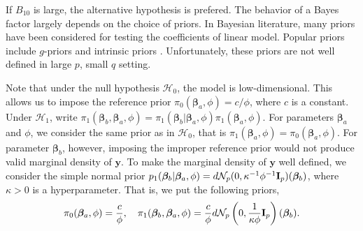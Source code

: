 \documentclass[11pt]{article}
\newcommand{\By}{\mathbf{y}}    \newcommand{\Bz}{\mathbf{z}}
\newcommand{\bfsym}[1]{\ensuremath{\boldsymbol{#1}}}
\def\bbeta{\bfsym \beta}
\theoremstyle{plain}
\theoremstyle{definition}
\theoremstyle{remark}
\begin{document}
If $B_{10}$ is large, the alternative hypothesis is prefered.
The behavior of a Bayes factor largely depends on the choice of priors.
In Bayesian literature, many priors have been considered for testing the coefficients of linear model.
Popular priors include $g$-priors \citep{Liang2008Mixtures} and intrinsic priors \citep{Casella2006Obj}.
Unfortunately, these priors are not well defined in large $p$, small $q$ setting.

Note that under the null hypothesis $\mathcal H_0$, the model is low-dimensional.
This allows us to impose the reference prior $\pi_0 (\bbeta_a,\phi)=c/\phi$, where $c$ is a constant.
Under $\mathcal H_1$,
write $\pi_1(\bbeta_b,\bbeta_a,\phi)=\pi_1(\bbeta_b|\bbeta_a,\phi) \pi_1(\bbeta_a,\phi)$.
For parameters $\bbeta_a $ and $\phi$, we consider the same prior as in $\mathcal H_0$, that is $\pi_1(\bbeta_a,\phi)=\pi_0(\bbeta_a,\phi)$.
For parameter $\bbeta_b$, however, imposing the improper reference prior would not produce valid marginal density of $\By$.
To make the marginal density of $\By$ well defined,
we consider the simple normal prior $p_1(\bbeta_b|\bbeta_a, \phi) = d \mathcal N_{p} (0, \kappa^{-1} \phi^{-1} \BI_{p}) (\bbeta_b) $, where $\kappa>0$ is a hyperparameter.
That is, we put the following priors,
\begin{equation}\label{priors}
    \pi_0(\bbeta_a,\phi)= \frac{c}{\phi},\quad
    \pi_1(\bbeta_b,\bbeta_a,\phi)=\frac{c}{\phi} d \mathcal N_{p} \left(0, \frac{1}{\kappa \phi} \BI_{p}\right) (\bbeta_b).
\end{equation}
\end{document}
